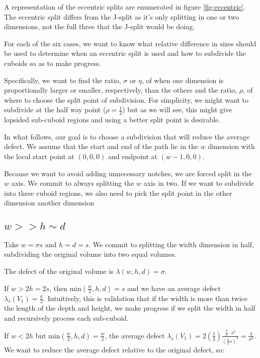 A representation of the eccentric splits are enumerated in figure \ref{fig:eccentric}.
The eccentric split differs from the J-split as it's only splitting in one or two
dimensions, not the full three that the J-split would be doing.

For each of the six cases, we want to know what relative difference in sizes should be used
to determine when an eccentric split is used and how to subdivide the cuboids so as to make progress.

Specifically, we want to find the ratio, $\sigma$ or $\eta$, of when one dimension is proportionally larger or smaller,
respectively, than the others and the ratio, $\rho$, of where to choose the split point of subdivision.
For simplicity, we might want to subdivide at the half way point ($\rho = \frac{1}{2}$) but as we
will see, this might give lopsided sub-cuboid regions and using a better split point is desirable.

In what follows, our goal is to choose a subdivision that will reduce the average defect.
We assume that the start and end of the path lie in the $w$ dimension with the local start point at $(0,0,0)$
and endpoint at $(w-1,0,0)$.

Because we want to avoid adding unnecessary notches, we are forced split in the $w$ axis.
We commit to always splitting the $w$ axis in two.
If we want to subdivide into three cuboid regions, we also need to pick the split point in the other dimension another dimension

\subsection{$w >> h \sim d$}

Take $w = \sigma s$ and $h = d = s$.
We commit to splitting the width dimension in half, subdividing the original volume into two equal volumes.

The defect of the original volume is $\lambda(w,h,d) = \sigma$.

If $w > 2h = 2s$, then $\text{min}(\frac{w}{2},h,d) = s$ and we have an average defect $\lambda_s(V_1) = \frac{\sigma}{2}$.
Intuitively, this is validation that if the width is more than twice the length of the depth and height, we make progress
if we split the width in half and recursively process each sub-cuboid.

If $w < 2h$ but $\text{min}(\frac{w}{2},h,d) = \frac{w}{2}$,
the average defect $\lambda_s(V_1) = 2 (\frac{1}{2}) \frac{ \frac{\sigma}{2} \cdot s^3 }{ (\frac{\sigma}{2} s)^3 } = \frac{4}{\sigma^2}$.
We want to reduce the average defect relative to the original defect, so:

